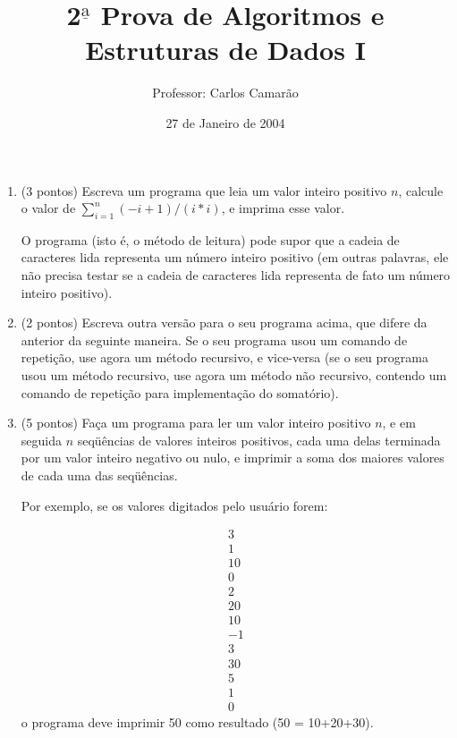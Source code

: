 
\title{2$^{\underline{\mbox{a}}}$ Prova de Algoritmos e Estruturas de Dados I}

\pagestyle{empty}	

\author{Professor: Carlos Camar\~ao}
\date{27 de Janeiro de 2004}



\maketitle
\thispagestyle{empty}

\begin{enumerate}

\item (3 pontos) Escreva um programa que leia um valor inteiro
positivo $n$, calcule o valor de $\sum_{i=1}^n (-i+1)/(i*i)$, e imprima
esse valor. 

O programa (isto \'e, o m\'etodo de leitura) pode supor que a cadeia
de caracteres lida representa um n\'umero inteiro positivo (em outras
palavras, ele n\~ao precisa testar se a cadeia de caracteres lida
representa de fato um n\'umero inteiro positivo).  

\item (2 pontos) Escreva outra vers\~ao para o seu programa acima, que
difere da anterior da seguinte maneira. Se o seu programa usou um
comando de repeti\c{c}\~ao, use agora um m\'etodo recursivo, e
vice-versa (se o seu programa usou um m\'etodo recursivo, use agora um
m\'etodo n\~ao recursivo, contendo um comando de repeti\c{c}\~ao para
implementa\c{c}\~ao do somat\'orio).

\item (5 pontos) Fa\c{c}a um programa para ler um valor inteiro
positivo $n$, e em seguida $n$ seq\"u\^encias de valores inteiros
positivos, cada uma delas terminada por um valor inteiro negativo ou
nulo, e imprimir a soma dos maiores valores de cada uma das
seq\"u\^encias.

Por exemplo, se os valores digitados pelo usu\'ario forem:
  
  \[ \begin{array}{l}
        3    \\
        1    \\
        10   \\
        0    \\
        2    \\
        20   \\
        10   \\
        -1   \\
        3    \\ 
        30   \\
        5    \\
        1    \\
        0    
      \end{array} \]
o programa deve imprimir 50 como resultado (50 = 10+20+30).


\end{enumerate}
